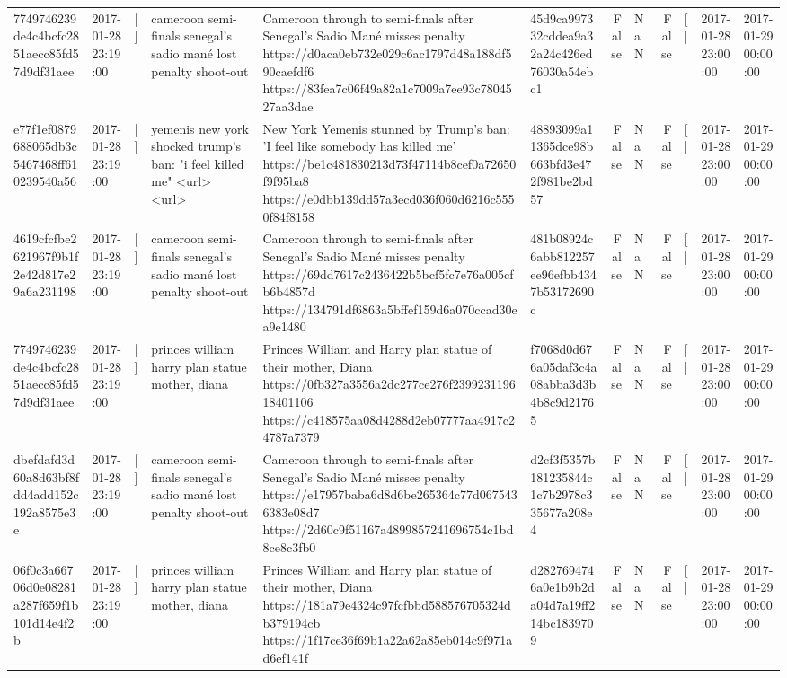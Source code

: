 \begin{tabular}{llllllrlrlll}
7749746239de4c4bcfc2851aecc85fd57d9df31aee & 2017-01-28 23:19:00 & [] & cameroon semi-finals senegal's sadio mané lost penalty shoot-out & Cameroon through to semi-finals after Senegal’s Sadio Mané misses penalty https://d0aca0eb732e029c6ac1797d48a188df590caefdf6 https://83fea7c06f49a82a1c7009a7ee93c7804527aa3dae & 45d9ca997332cddea9a32a24c426ed76030a54ebc1 & False & NaN & False & [] & 2017-01-28 23:00:00 & 2017-01-29 00:00:00 \\
e77f1ef0879688065db3c5467468ff610239540a56 & 2017-01-28 23:19:00 & [] & yemenis new york shocked trump's ban: "i feel killed me" <url> <url> & New York Yemenis stunned by Trump's ban: 'I feel like somebody has killed me' https://be1c481830213d73f47114b8cef0a72650f9f95ba8 https://e0dbb139dd57a3ecd036f060d6216c5550f84f8158 & 48893099a11365dce98b663bfd3e472f981be2bd57 & False & NaN & False & [] & 2017-01-28 23:00:00 & 2017-01-29 00:00:00 \\
4619cfcfbe2621967f9b1f2e42d817e29a6a231198 & 2017-01-28 23:19:00 & [] & cameroon semi-finals senegal's sadio mané lost penalty shoot-out & Cameroon through to semi-finals after Senegal’s Sadio Mané misses penalty https://69dd7617c2436422b5bcf5fc7e76a005cfb6b4857d https://134791df6863a5bffef159d6a070ccad30ea9e1480 & 481b08924c6abb812257ee96efbb4347b53172690c & False & NaN & False & [] & 2017-01-28 23:00:00 & 2017-01-29 00:00:00 \\
7749746239de4c4bcfc2851aecc85fd57d9df31aee & 2017-01-28 23:19:00 & [] & princes william harry plan statue mother, diana & Princes William and Harry plan statue of their mother, Diana https://0fb327a3556a2dc277ce276f239923119618401106 https://c418575aa08d4288d2eb07777aa4917c24787a7379 & f7068d0d676a05daf3c4a08abba3d3b4b8c9d21765 & False & NaN & False & [] & 2017-01-28 23:00:00 & 2017-01-29 00:00:00 \\
dbefdafd3d60a8d63bf8fdd4add152c192a8575e3e & 2017-01-28 23:19:00 & [] & cameroon semi-finals senegal's sadio mané lost penalty shoot-out & Cameroon through to semi-finals after Senegal’s Sadio Mané misses penalty https://e17957baba6d8d6be265364c77d0675436383e08d7 https://2d60c9f51167a4899857241696754c1bd8ce8c3fb0 & d2cf3f5357b181235844c1c7b2978c335677a208e4 & False & NaN & False & [] & 2017-01-28 23:00:00 & 2017-01-29 00:00:00 \\
06f0c3a66706d0e08281a287f659f1b101d14e4f2b & 2017-01-28 23:19:00 & [] & princes william harry plan statue mother, diana & Princes William and Harry plan statue of their mother, Diana https://181a79e4324c97fcfbbd588576705324db379194cb https://1f17ce36f69b1a22a62a85eb014c9f971ad6ef141f & d2827694746a0e1b9b2da04d7a19ff214bc1839709 & False & NaN & False & [] & 2017-01-28 23:00:00 & 2017-01-29 00:00:00 \\

\end{tabular}
